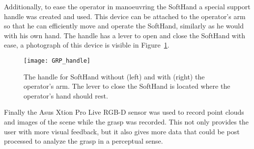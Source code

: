 Additionally, to ease the operator in manoeuvring the SoftHand a special support handle was created and used. This device can be attached to the operator's arm so that he can efficiently move and operate the SoftHand, similarly as he would with his own hand.
The handle has a lever to open and close the SoftHand with ease, a photograph of this device is visible in Figure~\ref{fig:grasp:handle}.
\begin{figure}[b!]
  \centering
  \texttt{[image: GRP\_handle]}
  \caption{The handle for SoftHand without (left) and with (right) the operator's arm. The lever to close the SoftHand is located where the operator's hand should rest.}
  \label{fig:grasp:handle}
\end{figure}

Finally the Asus Xtion Pro Live RGB-D sensor was used to record point clouds and images of the scene while the grasp was recorded. This not only provides the user with more visual feedback, but it also gives more data that
could be post processed to analyze the grasp in a perceptual sense.
